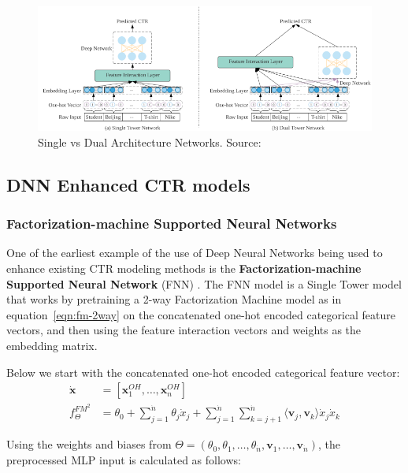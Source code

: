 \documentclass{mldsmsc}
\begin{document}
\begin{figure}[h]
    \centering
    \includegraphics[width=\textwidth]{../figures/single_dual_dnn.png}
    \caption{Single vs Dual Architecture Networks. Source: \citep{RefWorks:zhang2021deep}}
    \label{fig:single-dual-models}
\end{figure}

\subsection{DNN Enhanced CTR models}
\label{sec:mlp-enhanced-models}

\subsubsection{Factorization-machine Supported Neural Networks}

One of the earliest example of the use of Deep Neural Networks being used to enhance existing
CTR modeling methods is the \textbf{Factorization-machine Supported Neural Network} (FNN)
\citep{RefWorks:zhang2016deep}. The FNN model is a Single Tower model that works by pretraining
a 2-way Factorization Machine model as in equation~\ref{eqn:fm-2way} on the concatenated
one-hot encoded categorical feature vectors, and then using the feature interaction vectors and
weights as the embedding matrix.

Below we start with the concatenated one-hot encoded categorical feature vector:
\begin{align*}
    \dot{\mathbf{x}} &= \left[\mathbf{x}_1^{OH}, \ldots, \mathbf{x}_n^{OH} \right]\\
    f_{\Theta}^{FM^2} &= \theta_0 + \sum_{j=1}^{\dot{n}} \theta_j \dot{x}_j +
    \sum_{j=1}^{\dot{n}} \sum_{k=j+1}^{\dot{n}}
    \langle \mathbf{v}_j, \mathbf{v}_k \rangle \dot{x}_j \dot{x}_k
\end{align*}

Using the weights
and biases from $\Theta = (\theta_0, \theta_1, \ldots , \theta_{\dot{n}}, \mathbf{v}_1, \ldots, \mathbf{v}_{\dot{n}})$,
the preprocessed MLP input is calculated as follows:
\end{document}
